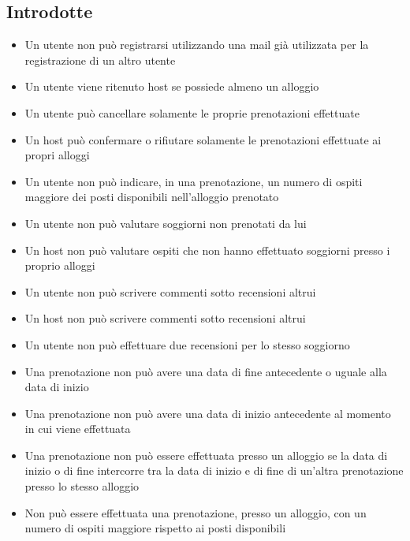 \subsection{Introdotte}
\begin{itemize}
  \item Un utente non può registrarsi utilizzando una mail già utilizzata per la registrazione di un altro utente
  \item Un utente viene ritenuto host se possiede almeno un alloggio
  \item Un utente può cancellare solamente le proprie prenotazioni effettuate
  \item Un host può confermare o rifiutare solamente le prenotazioni effettuate ai propri alloggi
  \item Un utente non può indicare, in una prenotazione, un numero di ospiti maggiore dei posti disponibili nell'alloggio prenotato
  \item Un utente non può valutare soggiorni non prenotati da lui
  \item Un host non può valutare ospiti che non hanno effettuato soggiorni presso i proprio alloggi
  \item Un utente non può scrivere commenti sotto recensioni altrui
  \item Un host non può scrivere commenti sotto recensioni altrui
  \item Un utente non può effettuare due recensioni per lo stesso soggiorno
  \item Una prenotazione non può avere una data di fine antecedente o uguale alla data di inizio
  \item Una prenotazione non può avere una data di inizio antecedente al momento in cui viene effettuata
  \item Una prenotazione non può essere effettuata presso un alloggio se la data di inizio o di fine intercorre tra la data di inizio e di fine di un'altra prenotazione presso lo stesso alloggio
  \item Non può essere effettuata una prenotazione, presso un alloggio, con un numero di ospiti maggiore rispetto ai posti disponibili
\end{itemize}